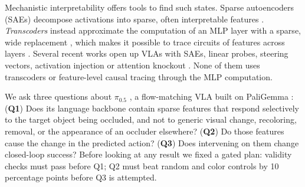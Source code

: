 \documentclass{article} %
\newcommand{\pifive}{$\pi_{0.5}$}
\begin{document}
Mechanistic interpretability offers tools to find such states. Sparse autoencoders (SAEs) decompose activations into sparse, often interpretable features \citep{bricken2023monosemanticity,cunningham2024sparse,gao2025scaling}. \emph{Transcoders} instead approximate the computation of an MLP layer with a sparse, wide replacement \citep{dunefsky2024transcoders}, which makes it possible to trace circuits of features across layers \citep{ameisen2025circuit,lindsey2025biology,marks2025sparse}. Several recent works open up VLAs with SAEs, linear probes, steering vectors, activation injection or attention knockout \citep{haon2025mechanistic,buurmeijer2026observing,swann2026sparse,grant2026features,jin2026event,shi2026vlatrace}. None of them uses transcoders or feature-level causal tracing through the MLP computation.

We ask three questions about \pifive{} \citep{pi2025pi05}, a flow-matching VLA built on PaliGemma \citep{beyer2024paligemma}:
(\textbf{Q1}) Does its language backbone contain sparse features that respond selectively to the target object being occluded, and not to generic visual change, recoloring, removal, or the appearance of an occluder elsewhere?
(\textbf{Q2}) Do those features cause the change in the predicted action?
(\textbf{Q3}) Does intervening on them change closed-loop success?
Before looking at any result we fixed a gated plan: validity checks must pass before Q1; Q2 must beat random and color controls by 10 percentage points before Q3 is attempted.
\end{document}
